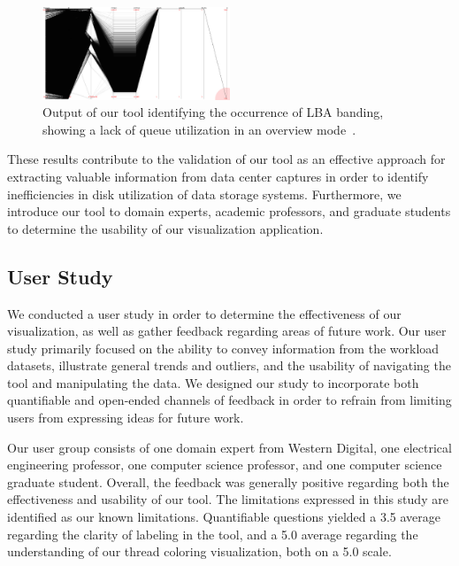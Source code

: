 \documentclass[journal]{vgtc}                %
\begin{document}
\begin{figure}[h!!]
 \centering
 \includegraphics[width=0.5\textwidth]{images/no_queue.eps}
 \caption[Output of our tool identifying the occurrence of LBA banding.]{Output of our tool identifying the occurrence of LBA banding, showing a lack of queue utilization in an overview mode~\cite{internal:collab}.}
 \label{fig:no_queue}
\end{figure}

These results contribute to the validation of our tool as an effective approach for extracting valuable information from data center captures in order to identify inefficiencies in disk utilization of data storage systems. Furthermore, we introduce our tool to domain experts, academic professors, and graduate students to determine the usability of our visualization application.

\subsection{User Study}
We conducted a user study in order to determine the effectiveness of our visualization, as well as gather feedback regarding areas of future work. Our user study primarily focused on the ability to convey information from the workload datasets, illustrate general trends and outliers, and the usability of navigating the tool and manipulating the data. We designed our study to incorporate both quantifiable and open-ended channels of feedback in order to refrain from limiting users from expressing ideas for future work.

Our user group consists of one domain expert from Western Digital, one electrical engineering professor, one computer science professor, and one computer science graduate student. Overall, the feedback was generally positive regarding both the effectiveness and usability of our tool. The limitations expressed in this study are identified as our known limitations. Quantifiable questions yielded a 3.5 average regarding the clarity of labeling in the tool, and a 5.0 average regarding the understanding of our thread coloring visualization, both on a 5.0 scale. 
\end{document}
